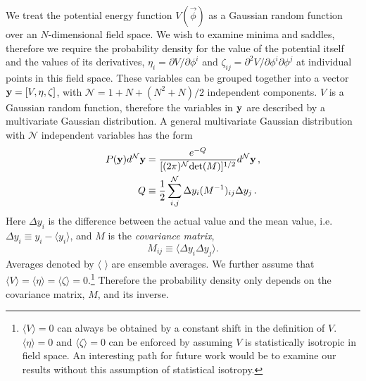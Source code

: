 \documentclass[12pt]{article}
\begin{document}
We treat the potential energy function $V({\vec{\phi}})$ as a Gaussian random function over an $N$-dimensional field space. We wish to examine minima and saddles, therefore we require the probability density for the value of the potential itself and the values of its derivatives, $\eta_i = \partial V/\partial \phi^i$ and $\zeta_{ij}=\partial^2 V/\partial \phi^i\partial \phi^j$ at individual points in this field space. These variables can be grouped together into a vector ${\bf y} = [V,\eta,\zeta]$, with $\mathcal{N}=1+N+(N^2+N)/2$ independent components. $V$ is a Gaussian random function, therefore the variables in ${\bf y}$ are described by a multivariate Gaussian distribution. A general multivariate Gaussian distribution with $\mathcal{N}$ independent variables has the form
\begin{equation} \label{MultivariateGaussian}
\begin{split}
P({\bf y})d^\mathcal{N}{\bf y} &= \frac{e^{-Q}}{[(2\pi)^\mathcal{N} \mathrm{det}(M)]^{1/2}} d^\mathcal{N}{\bf y} \, ,\\
Q &\equiv \frac{1}{2} \sum_{i,j}^\mathcal{N} \Delta y_i (M^{-1})_{ij} \Delta y_{j} \, .\\
\end{split}
\end{equation}
%
Here $\Delta y_i$ is the difference between the actual value and the mean value, i.e. $\Delta y_i \equiv y_i - \langle y_i \rangle$, and $M$ is the \emph{covariance matrix}, 
%
\begin{equation}
M_{ij} \equiv \langle \Delta y_i \Delta y_j \rangle.
\end{equation}
%
Averages denoted by $\langle \,\,\rangle$ are ensemble averages. We further assume that $\langle V\rangle = \langle \eta\rangle = \langle \zeta\rangle = 0$.\footnote{$\langle V\rangle=0$ can always be obtained by a constant shift in the definition of $V$. $\langle \eta \rangle = 0$ and $\langle \zeta\rangle = 0$ can be enforced by assuming $V$ is statistically isotropic in field space. An interesting path for future work would be to examine our results without this assumption of statistical isotropy.} Therefore the probability density only depends on the covariance matrix, $M$, and its inverse.
\end{document}
